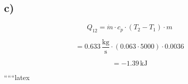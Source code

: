 

\subsection*{c)}
\[
Q_{12} = \dot{m} \cdot c_p \cdot (T_2 - T_1) \cdot m
\]

\[
= 0.633 \, \frac{\text{kg}}{\text{s}} \cdot (0.063 \cdot 5000) \cdot 0.0036
\]

\[
= -1.39 \, \text{kJ}
\]

``````latex